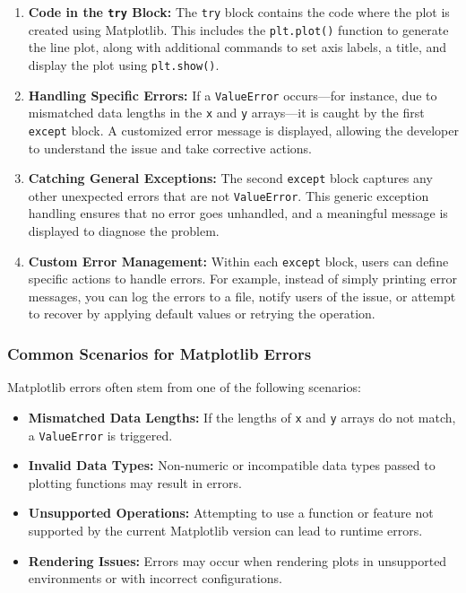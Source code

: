 \begin{enumerate}
	\item \textbf{Code in the \texttt{try} Block:}
	The \texttt{try} block contains the code where the plot is created using Matplotlib. This includes the \texttt{plt.plot()} function to generate the line plot, along with additional commands to set axis labels, a title, and display the plot using \texttt{plt.show()}.
	
	\item \textbf{Handling Specific Errors:}
	If a \texttt{ValueError} occurs—for instance, due to mismatched data lengths in the \texttt{x} and \texttt{y} arrays—it is caught by the first \texttt{except} block. A customized error message is displayed, allowing the developer to understand the issue and take corrective actions.
	
	\item \textbf{Catching General Exceptions:}
	The second \texttt{except} block captures any other unexpected errors that are not \texttt{ValueError}. This generic exception handling ensures that no error goes unhandled, and a meaningful message is displayed to diagnose the problem.
	
	\item \textbf{Custom Error Management:}
	Within each \texttt{except} block, users can define specific actions to handle errors. For example, instead of simply printing error messages, you can log the errors to a file, notify users of the issue, or attempt to recover by applying default values or retrying the operation.
\end{enumerate}

\subsubsection{Common Scenarios for Matplotlib Errors}

Matplotlib errors often stem from one of the following scenarios:
\begin{itemize}
	\item \textbf{Mismatched Data Lengths:} If the lengths of \texttt{x} and \texttt{y} arrays do not match, a \texttt{ValueError} is triggered.
	\item \textbf{Invalid Data Types:} Non-numeric or incompatible data types passed to plotting functions may result in errors.
	\item \textbf{Unsupported Operations:} Attempting to use a function or feature not supported by the current Matplotlib version can lead to runtime errors.
	\item \textbf{Rendering Issues:} Errors may occur when rendering plots in unsupported environments or with incorrect configurations.
\end{itemize}

